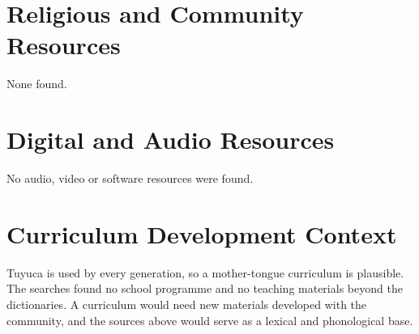 \documentclass[12pt]{article}
\begin{document}
\section{Religious and Community Resources}
None found.

\section{Digital and Audio Resources}
No audio, video or software resources were found.

\section{Curriculum Development Context}
Tuyuca is used by every generation, so a mother-tongue curriculum is plausible. The searches found no school programme and no teaching materials beyond the dictionaries. A curriculum would need new materials developed with the community, and the sources above would serve as a lexical and phonological base.
\end{document}
